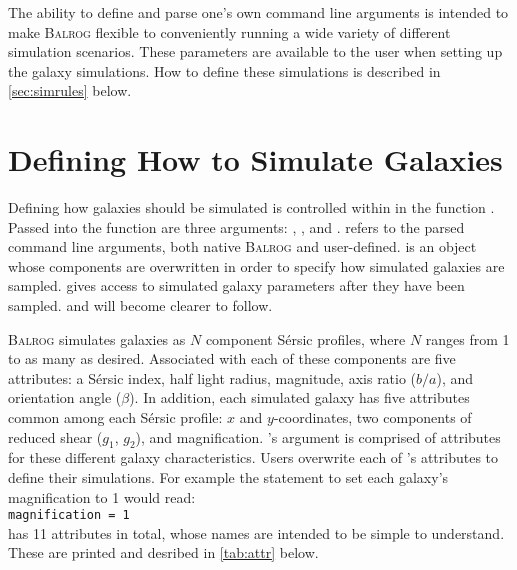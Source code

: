 \documentclass[12pt]{article}
\newcommand{\balrog}{\textsc{Balrog}}
\newcommand{\inset}{\\[0.4cm]}
\newcommand{\sersic}{S\'{e}rsic}
\begin{document}
\noindent The ability to define and parse one's own command line arguments is intended to make
\balrog{} flexible to conveniently running a wide variety of different
simulation scenarios. These parameters are available to the user 
when setting up the galaxy simulations. How to define these simulations is described in
\autoref{sec:simrules} below.

\section{Defining How to Simulate Galaxies}
\label{sec:simrules}

Defining how galaxies should be simulated is controlled within \config{}
in the function \simfunc{}. Passed into the function are three
arguments: \simargs{}, \simrules{}, and \simsamp{}.
\simargs{} refers to the parsed command line arguments,
both native \balrog{} and user-defined.
\simrules{} is an object whose components are overwritten
in order to specify how simulated galaxies are sampled.
\simsamp{} gives access to simulated galaxy parameters
after they have been sampled. \simrules{} and \simsamp{}
will become clearer to follow.

\balrog{} simulates galaxies as $N$ component \sersic{} profiles, 
where $N$ ranges from 1 to as many as desired. Associated
with each of these components are five attributes: a \sersic{} index,
half light radius, magnitude, axis ratio ($b/a$), and orientation
angle ($\beta$). In addition, each simulated galaxy has five attributes
common among each \sersic{} profile: $x$ and $y$-coordinates,
two components of reduced shear ($g_1$, $g_2$), and magnification.
\simfunc{}'s argument \simrules{} is comprised of attributes
for these different galaxy characteristics. Users overwrite
each of \simrules{}'s attributes to define their simulations.
For example the statement to set each galaxy's magnification
to 1 would read:
\inset
\texttt{magnification = 1}
\inset
\simrules{} has 11 attributes in total, whose names are intended to be simple to understand.
These are printed and desribed in \autoref{tab:attr} below.
\end{document}
